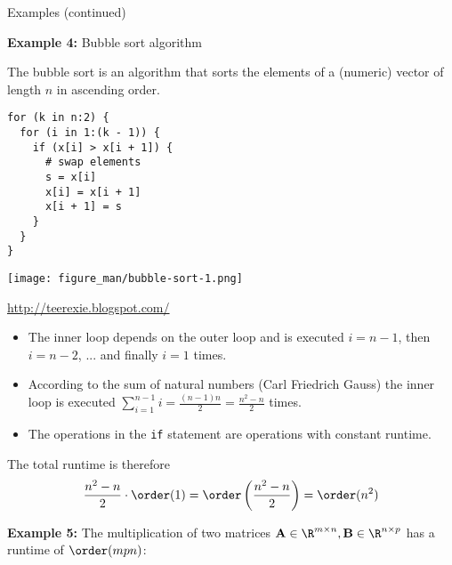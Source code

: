 \documentclass[11pt,compress,t,notes=noshow, xcolor=table]{beamer}
\begin{document}
\begin{vbframe}{Examples (continued)}

\textbf{Example 4: } Bubble sort algorithm

\vspace*{0.2cm}

The bubble sort is an algorithm that sorts the elements of a (numeric) vector of length $n$ in ascending order.

\vspace*{0.4cm}

\begin{minipage}{.45\textwidth}
\begin{footnotesize}
\begin{verbatim}
for (k in n:2) {
  for (i in 1:(k - 1)) {
    if (x[i] > x[i + 1]) {
      # swap elements
      s = x[i]
      x[i] = x[i + 1]
      x[i + 1] = s
    }
  }
}
\end{verbatim}
\end{footnotesize}
\end{minipage}\hfill
\begin{minipage}{.45\textwidth}
\texttt{[image: figure\_man/bubble-sort-1.png]}\\
\begin{footnotesize}
\url{http://teerexie.blogspot.com/}
\end{footnotesize}

\end{minipage}

\framebreak

\begin{itemize}
\item The inner loop depends on the outer loop and is executed $i = n - 1$, then $i = n - 2$, ... and finally $i = 1$ times.
\item According to the sum of natural numbers (Carl Friedrich Gauss) the inner loop is executed $\sum_{i = 1}^{n - 1} i = \frac{(n - 1)n}{2} = \frac{n^2 - n}{2}$ times.
\item The operations in the \texttt{if} statement are operations with constant runtime.
\end{itemize}

The total runtime is therefore
$$\frac{n^2 - n}{2} \cdot\order(1) = \order\left(\frac{n^2 - n}{2}\right) = \order(n^2)$$

\framebreak

\textbf{Example 5: } The multiplication of two matrices $\mathbf{A} \in \R^{m \times n}, \mathbf{B} \in \R^{n \times p}$ has a runtime of $\order(mpn)$:


\end{vbframe}
\end{document}

